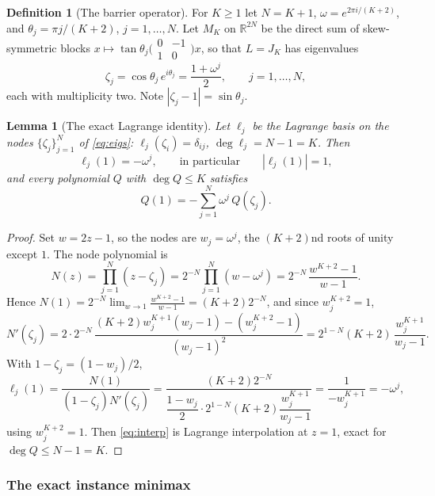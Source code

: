 \documentclass[11pt]{article}
\newtheorem{lemma}[theorem]{Lemma}
\theoremstyle{definition}
\newtheorem{definition}[theorem]{Definition}
\theoremstyle{remark}
\newcommand{\R}{\mathbb{R}}
\newcommand{\abs}[1]{| #1 |}
\begin{document}
\begin{definition}[The barrier operator]\label{def:barrier}
For $K\ge1$ let $N=K+1$, $\omega=e^{2\pi i/(K+2)}$, and
$\theta_j=\pi j/(K+2)$, $j=1,\dots,N$. Let $M_K$ on $\R^{2N}$ be the direct
sum of skew-symmetric blocks $x\mapsto\tan\theta_j
\big(\begin{smallmatrix}0&-1\\1&0\end{smallmatrix}\big)x$, so that $L=J_K$
has eigenvalues
\begin{equation}\label{eq:eigs}
\zeta_j=\cos\theta_j\,e^{i\theta_j}=\frac{1+\omega^j}{2},
\qquad j=1,\dots,N,
\end{equation}
each with multiplicity two. Note $\abs{\zeta_j-1}=\sin\theta_j$.
\end{definition}

\begin{lemma}[The exact Lagrange identity]\label{lem:lagrange}
Let $\ell_j$ be the Lagrange basis on the nodes $\{\zeta_j\}_{j=1}^N$ of
\eqref{eq:eigs}: $\ell_j(\zeta_i)=\delta_{ij}$, $\deg\ell_j=N-1=K$. Then
\begin{equation}\label{eq:lagrange}
\ell_j(1)=-\omega^j,\qquad\text{in particular}\qquad \abs{\ell_j(1)}=1,
\end{equation}
and every polynomial $Q$ with $\deg Q\le K$ satisfies
\begin{equation}\label{eq:interp}
Q(1)=-\sum_{j=1}^{N}\omega^j\,Q(\zeta_j).
\end{equation}
\end{lemma}
\begin{proof}
Set $w=2z-1$, so the nodes are $w_j=\omega^j$, the $(K+2)$nd roots of unity
except $1$. The node polynomial is
\[
N(z)=\prod_{j=1}^{N}(z-\zeta_j)
=2^{-N}\prod_{j=1}^{N}(w-\omega^j)
=2^{-N}\,\frac{w^{K+2}-1}{w-1}.
\]
Hence $N(1)=2^{-N}\lim_{w\to1}\frac{w^{K+2}-1}{w-1}=(K+2)2^{-N}$, and since
$w_j^{K+2}=1$,
\[
N'(\zeta_j)
=2\cdot2^{-N}\,\frac{(K+2)w_j^{K+1}(w_j-1)-(w_j^{K+2}-1)}{(w_j-1)^2}
=2^{1-N}(K+2)\,\frac{w_j^{K+1}}{w_j-1}.
\]
With $1-\zeta_j=(1-w_j)/2$,
\[
\ell_j(1)=\frac{N(1)}{(1-\zeta_j)N'(\zeta_j)}
=\frac{(K+2)2^{-N}}{\dfrac{1-w_j}2\cdot
2^{1-N}(K+2)\dfrac{w_j^{K+1}}{w_j-1}}
=\frac{1}{-w_j^{K+1}}=-\omega^j,
\]
using $w_j^{K+2}=1$. Then \eqref{eq:interp} is Lagrange interpolation at
$z=1$, exact for $\deg Q\le N-1=K$.
\end{proof}

\subsubsection{The exact instance minimax}
\end{document}
